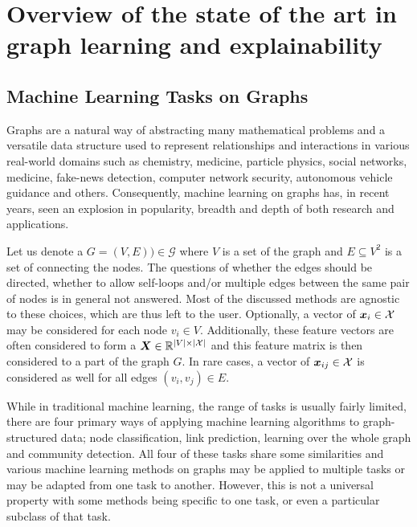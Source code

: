 \chapter{Overview of the state of the art in graph learning and explainability}
\label{chap:sota}

\section{Machine Learning Tasks on Graphs}

Graphs are a natural way of abstracting many mathematical problems and a versatile data structure used to represent relationships and interactions in various real-world domains such as chemistry, medicine, particle physics, social networks, medicine, fake-news detection, computer network security, autonomous vehicle guidance and others. Consequently, machine learning on graphs has, in recent years, seen an explosion in popularity, breadth and depth of both research and applications.

Let us denote a  \( G = \left( V, E \right)) \in \mathcal{G} \) where \( V \) is a set of the graph  and \( E \subseteq V^2 \) is a set of  connecting the nodes. The questions of whether the edges should be directed, whether to allow self-loops and/or multiple edges between the same pair of nodes is in general not answered. Most of the discussed methods are agnostic to these choices, which are thus left to the user. Optionally, a vector of  \( \bm{x}_i \in \mathcal{X} \) may be considered for each node \( v_i \in V \). Additionally, these feature vectors are often considered to form a  \( \bm{X} \in \mathbb{R}^{\left\lvert V \right\rvert \times \left\lvert \mathcal{X} \right\rvert} \) and this feature matrix is then considered to a part of the graph \( G \). In rare cases, a vector of  \( \bm{x}_{ij} \in \mathcal{X} \) is considered as well for all edges \( \left( v_i, v_j \right) \in E \). 

While in traditional machine learning, the range of tasks is usually fairly limited, there are four primary ways of applying machine learning algorithms to graph-structured data; node classification, link prediction, learning over the whole graph and community detection. All four of these tasks share some similarities and various machine learning methods on graphs may be applied to multiple tasks or may be adapted from one task to another. However, this is not a universal property with some methods being specific to one task, or even a particular subclass of that task.

